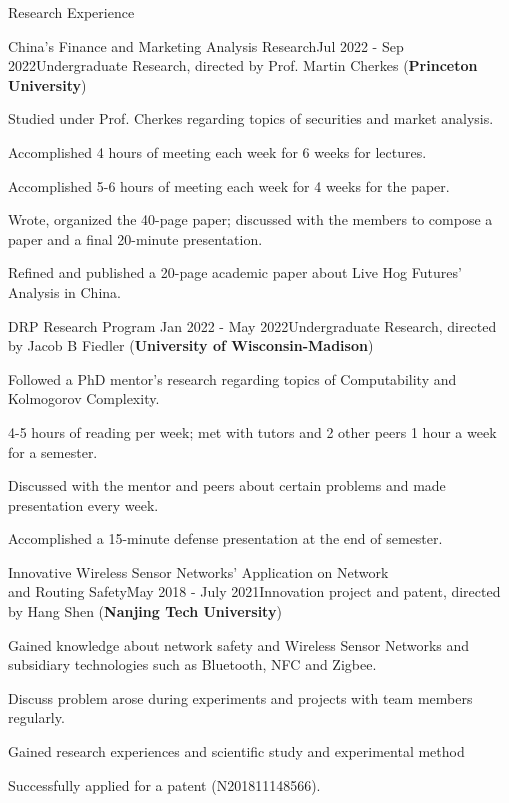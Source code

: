 \documentclass{resume} %
\begin{document}

\begin{rSection}{Research Experience}

\begin{rSubsection}{China's Finance and Marketing Analysis Research}{Jul 2022 - Sep 2022}{Undergraduate Research, directed by Prof. Martin Cherkes (\textbf{Princeton University})}{}

\item Studied under Prof. Cherkes regarding topics of securities and market analysis. 
\item Accomplished 4 hours of meeting each week for 6 weeks for lectures. 
\item Accomplished 5-6 hours of meeting each week for 4 weeks for the paper. 
\item Wrote, organized the 40-page paper; discussed with the members to compose a paper and a final 20-minute presentation. 
\item Refined and published a 20-page academic paper about Live Hog Futures' Analysis in China. 
\end{rSubsection}

\begin{rSubsection}{DRP Research Program }{Jan 2022 - May 2022}{Undergraduate Research, directed by Jacob B Fiedler (\textbf{University of Wisconsin-Madison})}{}
\item Followed a PhD mentor's research regarding topics of Computability and Kolmogorov Complexity. 
\item 4-5 hours of reading per week; met with tutors and 2 other peers 1 hour a week for a semester. 
\item Discussed with the mentor and peers about certain problems and made presentation every week. 
\item Accomplished a 15-minute defense presentation at the end of semester.   
\end{rSubsection}

\begin{rSubsection}{Innovative Wireless Sensor Networks' Application on Network \\and Routing Safety}{May 2018 - July 2021}{Innovation project and  patent, directed by Hang Shen (\textbf{Nanjing Tech University})}{}
\item Gained knowledge about network safety and Wireless Sensor Networks and subsidiary technologies 
such as Bluetooth, NFC and Zigbee. 
\item Discuss problem arose during experiments and projects with team members regularly.
\item Gained research experiences and scientific study and experimental method 

\item Successfully applied for a patent (N201811148566).  
\end{rSubsection}
\end{rSection}
\end{document}

